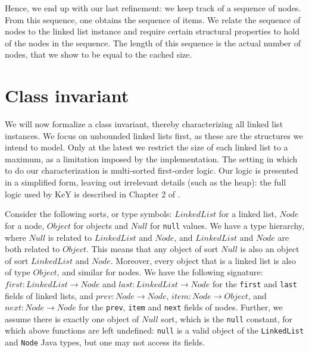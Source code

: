 \documentclass[runningheads]{llncs}
\begin{document}
Hence, we end up with our last refinement: we keep track of a sequence of nodes. From this sequence, one obtains the sequence of items. We relate the sequence of nodes to the linked list instance and require certain structural properties to hold of the nodes in the sequence. The length of this sequence is the actual number of nodes, that we show to be equal to the cached size.

%

\section{Class invariant}\label{sec:class-invariant}

We will now formalize a class invariant, thereby characterizing all linked list instances. We focus on unbounded linked lists first, as these are the structures we intend to model. Only at the latest we restrict the size of each linked list to a maximum, as a limitation imposed by the implementation. The setting in which to do our characterization is multi-sorted first-order logic. Our logic is presented in a simplified form, leaving out irrelevant details (such as the heap): the full logic used by KeY is described in Chapter 2 of \cite{KeYbook}.

Consider the following sorts, or type symbols: $\mathit{LinkedList}$ for a linked list, $\mathit{Node}$ for a node, $\mathit{Object}$ for objects and $\mathit{Null}$ for \texttt{null} values. We have a type hierarchy, where $\mathit{Null}$ is related to $\mathit{LinkedList}$ and $\mathit{Node}$, and $\mathit{LinkedList}$ and $\mathit{Node}$ are both related to $\mathit{Object}$. This means that any object of sort $\mathit{Null}$ is also an object of sort $\mathit{LinkedList}$ and $\mathit{Node}$. Moreover, every object that is a linked list is also of type $\mathit{Object}$, and similar for nodes.
We have the following signature: $\mathit{first}: \mathit{LinkedList}\to \mathit{Node}$ and $\mathit{last}: \mathit{LinkedList}\to \mathit{Node}$ for the \texttt{first} and \texttt{last} fields of linked lists, and $\mathit{prev}: \mathit{Node}\to \mathit{Node}$, $\mathit{item}: \mathit{Node}\to \mathit{Object}$, and $\mathit{next}: \mathit{Node}\to \mathit{Node}$ for the \texttt{prev}, \texttt{item} and \texttt{next} fields of nodes. Further, we assume there is exactly one object of $\mathit{Null}$ sort, which is the \texttt{null} constant, for which above functions are left undefined: \texttt{null} is a valid object of the \texttt{LinkedList} and \texttt{Node} Java types, but one may not access its fields.
\end{document}
